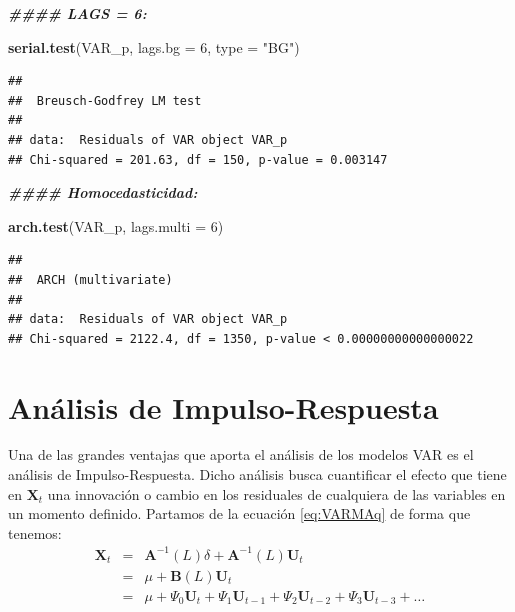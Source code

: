 \documentclass[
]{book}
\newenvironment{Shaded}{\begin{snugshade}}{\end{snugshade}}
\newcommand{\AttributeTok}[1]{\textcolor[rgb]{0.13,0.29,0.53}{#1}}
\newcommand{\DecValTok}[1]{\textcolor[rgb]{0.00,0.00,0.81}{#1}}
\newcommand{\DocumentationTok}[1]{\textcolor[rgb]{0.56,0.35,0.01}{\textbf{\textit{#1}}}}
\newcommand{\FunctionTok}[1]{\textcolor[rgb]{0.13,0.29,0.53}{\textbf{#1}}}
\newcommand{\NormalTok}[1]{#1}
\newcommand{\StringTok}[1]{\textcolor[rgb]{0.31,0.60,0.02}{#1}}
\begin{document}
\begin{Shaded}
\begin{Highlighting}[]
\DocumentationTok{\#\#\#\# LAGS = 6:}

\FunctionTok{serial.test}\NormalTok{(VAR\_p, }\AttributeTok{lags.bg =} \DecValTok{6}\NormalTok{, }\AttributeTok{type =} \StringTok{"BG"}\NormalTok{)}
\end{Highlighting}
\end{Shaded}

\begin{verbatim}
## 
##  Breusch-Godfrey LM test
## 
## data:  Residuals of VAR object VAR_p
## Chi-squared = 201.63, df = 150, p-value = 0.003147
\end{verbatim}

\begin{Shaded}
\begin{Highlighting}[]
\DocumentationTok{\#\#\#\# Homocedasticidad:}

\FunctionTok{arch.test}\NormalTok{(VAR\_p, }\AttributeTok{lags.multi =} \DecValTok{6}\NormalTok{)}
\end{Highlighting}
\end{Shaded}

\begin{verbatim}
## 
##  ARCH (multivariate)
## 
## data:  Residuals of VAR object VAR_p
## Chi-squared = 2122.4, df = 1350, p-value < 0.00000000000000022
\end{verbatim}

\hypertarget{anuxe1lisis-de-impulso-respuesta}{%
\section{Análisis de Impulso-Respuesta}\label{anuxe1lisis-de-impulso-respuesta}}

Una de las grandes ventajas que aporta el análisis de los modelos VAR es
el análisis de Impulso-Respuesta. Dicho análisis busca cuantificar el
efecto que tiene en \(\mathbf{X}_t\) una innovación o cambio en los
residuales de cualquiera de las variables en un momento definido.
Partamos de la ecuación \eqref{eq:VARMAq} de forma que tenemos:
\begin{eqnarray}
    \mathbf{X}_t & = & \mathbf{A}^{-1}(L) \delta + \mathbf{A}^{-1}(L) \mathbf{U}_t \nonumber \\
    & = & \mu + \mathbf{B}(L) \mathbf{U}_t \nonumber \\
    & = & \mu + \Psi_0 \mathbf{U}_t + \Psi_1 \mathbf{U}_{t-1} + \Psi_2 \mathbf{U}_{t-2} + \Psi_3 \mathbf{U}_{t-3} + \ldots
\end{eqnarray}
\end{document}
